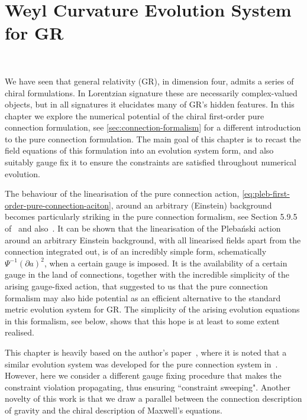 \documentclass[10pt]{report}
\newcommand{\pleb}[0]{Pleba\'nski}
\theoremstyle{definition}
\begin{document}
    \newpage
\chapter{Weyl Curvature Evolution System for GR}~\label{chap:pure-connection-numerical-relativity}

We have seen that general relativity (GR), in dimension four, admits a series of chiral formulations. In Lorentzian signature these are necessarily complex-valued objects, but in all signatures it elucidates many of GR's hidden features. In this chapter we explore the numerical potential of the chiral first-order pure connection formulation, see \cref{sec:connection-formalism} for a different introduction to the pure connection formulation. The main goal of this chapter is to recast the field equations of this formulation into an evolution system form, and also suitably gauge fix it to ensure the constraints are satisfied throughout numerical evolution.

The behaviour of the linearisation of the pure connection action, \cref{eq:pleb-first-order-pure-connection-aciton}, around an arbitrary (Einstein) background becomes particularly striking in the pure connection formalism, see Section 5.9.5 of~\cite{PlebanskiFormuKrasno2009} and also~\cite{Local_rigidity_Fine_2021}. It can be shown that the linearisation of the \pleb{} action around an arbitrary Einstein background, with all linearised fields apart from the connection integrated out, is of an incredibly simple form, schematically $\Psi^{-1} (\partial a)^2$, when a certain gauge is imposed. It is the availability of a certain gauge in the land of connections, together with the incredible simplicity of the arising gauge-fixed action, that suggested to us that the pure connection formalism may also hide potential as an efficient alternative to the standard metric evolution system for GR. The simplicity of the arising evolution equations in this formalism, see below, shows that this hope is at least to some extent realised. 

This chapter is heavily based on the author's paper~\cite{WeylCurvatureKrasno2022}, where it is noted that a similar evolution system was developed for the pure connection system in~\cite{A_connection_ap_Salisb_1994}. However, here we consider a different gauge fixing procedure that makes the constraint violation propagating, thus ensuring ``constraint sweeping". Another novelty of this work is that we draw a parallel between the connection description of gravity and the chiral description of Maxwell's equations.
\end{document}

